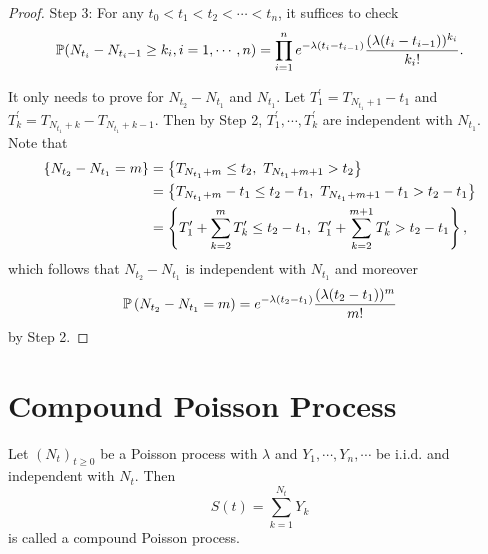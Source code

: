 \begin{proof}
    \noindent Step 3: For any $t_0 < t_1 < t_2 < \cdots < t_n$, it suffices to check
    \begin{equation*}
        \mathbb{P}(N_{t_i} - N_{t_i - 1} \geq k_i,i=1,\cdots,n) = \prod_{i=1}^{n} e^{-\lambda (t_i - t_{i-1})}\frac{(\lambda(t_i-t_{i-1}))^{k_i}}{k_i!}.
    \end{equation*}

    \noindent It only needs to prove for $N_{t_2} - N_{t_1}$ and $N_{t_1}$. Let $T_1^\prime = T_{N_{t_1}+1} - t_1$ and $T_k^\prime = T_{N_{t_1} + k} - T_{N_{t_1} + k - 1}$. Then by Step 2, $T_1^\prime,\cdots,T_k^\prime$ are independent with $N_{t_1}$. Note that
    \begin{equation*}
        \begin{aligned}
            \left\{N_{t_2} - N_{t_1} = m\right\} &= \left\{T_{N_{t_1}+m} \leq t_2,~T_{N_{t_1}+m + 1} > t_2\right\} \\
            &= \left\{T_{N_{t_1}+m} - t_1 \leq t_2 - t_1,~T_{N_{t_1}+m + 1} - t_1 > t_2 - t_1\right\} \\
            &= \left\{ T_1^\prime + \sum_{k=2}^m T_k^\prime \leq t_2 - t_1,~ T_1^\prime + \sum_{k=2}^{m+1} T_k^\prime > t_2 - t_1\right\},
        \end{aligned}
    \end{equation*}
    which follows that $N_{t_2} - N_{t_1}$ is independent with $N_{t_1}$ and moreover
    \begin{equation*}
        \mathbb{P} \left(N_{t_2} - N_{t_1} = m\right) = e^{-\lambda(t_2 - t_1)}\frac{(\lambda(t_2 - t_1))^m}{m!}
    \end{equation*}
    by Step 2.
\end{proof}

\section{Compound Poisson Process}

\begin{defn}
    Let $(N_t)_{t \geq 0}$ be a Poisson process with $\lambda$ and $Y_1,\cdots,Y_n,\cdots$ be i.i.d. and independent with $N_t$. Then
    \begin{equation*}
        S(t) = \sum_{k=1}^{N_t}Y_k
    \end{equation*}
    is called a compound Poisson process.
\end{defn}


